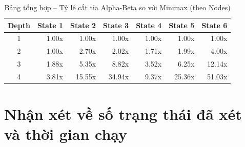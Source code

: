 \documentclass[12pt,a4paper]{article}
\begin{document}
\begin{table}[H]
\centering
\caption{Kết quả thực nghiệm -- State 6 (Phức tạp, 9 quân, lượt O)}
\end{table}

\begin{table}[H]
\centering
\caption{Bảng tổng hợp -- Tỷ lệ cắt tỉa Alpha-Beta so với Minimax (theo Nodes)}
\begin{tabular}{c|rrrrrr}
\toprule
\textbf{Depth} & \textbf{State 1} & \textbf{State 2} & \textbf{State 3} & \textbf{State 4} & \textbf{State 5} & \textbf{State 6} \\
\midrule
1 & 1.00x & 1.00x  & 1.00x  & 1.00x & 1.00x  & 1.00x \\
2 & 1.00x & 2.70x  & 2.02x  & 1.71x & 1.99x  & 4.00x \\
3 & 1.88x & 5.35x  & 8.82x  & 3.52x & 6.25x  & 12.14x \\
4 & 3.81x & 15.55x & 34.94x & 9.37x & 25.36x & 51.03x \\
\bottomrule
\end{tabular}
\end{table}

\section{Nhận xét về số trạng thái đã xét và thời gian chạy}
\end{document}
